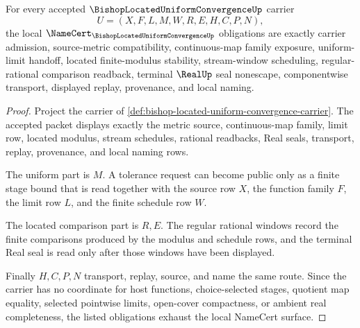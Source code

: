 \begin{theorem}
\label{thm:bishop-located-uniform-convergence-obligations}
For every accepted $\BishopLocatedUniformConvergenceUp$ carrier
$$
U=(X,F,L,M,W,R,E,H,C,P,N),
$$
the local $\NameCert_{\BishopLocatedUniformConvergenceUp}$ obligations are exactly carrier admission, source-metric compatibility, continuous-map family exposure, uniform-limit handoff, located finite-modulus stability, stream-window scheduling, regular-rational comparison readback, terminal $\RealUp$ seal nonescape, componentwise transport, displayed replay, provenance, and local naming.
\end{theorem}
\begin{proof}
Project the carrier of \autoref{def:bishop-located-uniform-convergence-carrier}. The accepted packet displays exactly the metric source, continuous-map family, limit row, located modulus, stream schedules, rational readbacks, Real seals, transport, replay, provenance, and local naming rows.

The uniform part is $M$. A tolerance request can become public only as a finite stage bound that is read together with the source row $X$, the function family $F$, the limit row $L$, and the finite schedule row $W$.

The located comparison part is $R,E$. The regular rational windows record the finite comparisons produced by the modulus and schedule rows, and the terminal Real seal is read only after those windows have been displayed.

Finally $H,C,P,N$ transport, replay, source, and name the same route. Since the carrier has no coordinate for host functions, choice-selected stages, quotient map equality, selected pointwise limits, open-cover compactness, or ambient real completeness, the listed obligations exhaust the local NameCert surface.
\end{proof}

